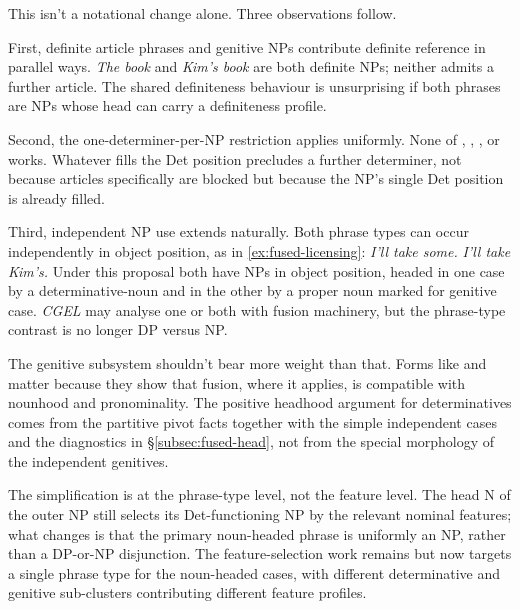 \documentclass[12pt]{article}
\begin{document}
This isn't a notational change alone. Three observations follow.

First, definite article phrases and genitive NPs contribute definite reference in parallel ways. \textit{The book} and \textit{Kim's book} are both definite NPs; neither admits a further article. The shared definiteness behaviour is unsurprising if both phrases are NPs whose head can carry a definiteness profile.

Second, the one-determiner-per-NP restriction applies uniformly. None of , , , or  works. Whatever fills the Det position precludes a further determiner, not because articles specifically are blocked but because the NP's single Det position is already filled.

Third, independent NP use extends naturally. Both phrase types can occur independently in object position, as in \ref{ex:fused-licensing}:
\ea\label{ex:fused-licensing}
\ea \textit{I'll take some.}
\ex \textit{I'll take Kim's.}
\z
\z
Under this proposal both have NPs in object position, headed in one case by a determinative-noun and in the other by a proper noun marked for genitive case. \textit{CGEL} may analyse one or both with fusion machinery, but the phrase-type contrast is no longer DP versus NP.

The genitive subsystem shouldn't bear more weight than that. Forms like  and  matter because they show that fusion, where it applies, is compatible with nounhood and pronominality. The positive headhood argument for determinatives comes from the partitive pivot facts together with the simple independent cases and the diagnostics in §\ref{subsec:fused-head}, not from the special morphology of the independent genitives.

The simplification is at the phrase-type level, not the feature level. The head N of the outer NP still selects its Det-functioning NP by the relevant nominal features; what changes is that the primary noun-headed phrase is uniformly an NP, rather than a DP-or-NP disjunction. The feature-selection work remains but now targets a single phrase type for the noun-headed cases, with different determinative and genitive sub-clusters contributing different feature profiles.
\end{document}
